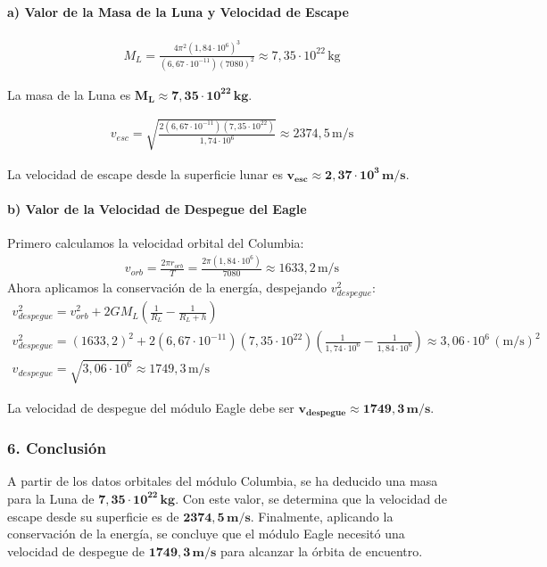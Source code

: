 \paragraph*{a) Valor de la Masa de la Luna y Velocidad de Escape}
\begin{gather}
    M_L = \frac{4\pi^2 (1,84 \cdot 10^6)^3}{(6,67 \cdot 10^{-11})(7080)^2} \approx 7,35 \cdot 10^{22} \, \text{kg}
\end{gather}
\begin{cajaresultado}
    La masa de la Luna es $\boldsymbol{M_L \approx 7,35 \cdot 10^{22} \, kg}$.
\end{cajaresultado}
\medskip
\begin{gather}
    v_{esc} = \sqrt{\frac{2 (6,67 \cdot 10^{-11}) (7,35 \cdot 10^{22})}{1,74 \cdot 10^6}} \approx 2374,5 \, \text{m/s}
\end{gather}
\begin{cajaresultado}
    La velocidad de escape desde la superficie lunar es $\boldsymbol{v_{esc} \approx 2,37 \cdot 10^3 \, m/s}$.
\end{cajaresultado}

\paragraph*{b) Valor de la Velocidad de Despegue del Eagle}
Primero calculamos la velocidad orbital del Columbia:
\begin{gather}
    v_{orb} = \frac{2\pi r_{orb}}{T} = \frac{2\pi (1,84 \cdot 10^6)}{7080} \approx 1633,2 \, \text{m/s}
\end{gather}
Ahora aplicamos la conservación de la energía, despejando $v_{despegue}^2$:
\begin{gather}
    v_{despegue}^2 = v_{orb}^2 + 2 G M_L \left(\frac{1}{R_L} - \frac{1}{R_L+h}\right) \nonumber \\
    v_{despegue}^2 = (1633,2)^2 + 2(6,67\cdot 10^{-11})(7,35\cdot 10^{22}) \left(\frac{1}{1,74\cdot 10^6} - \frac{1}{1,84\cdot 10^6}\right) \approx 3,06 \cdot 10^6 \, (\text{m/s})^2 \nonumber \\
    v_{despegue} = \sqrt{3,06 \cdot 10^6} \approx 1749,3 \, \text{m/s}
\end{gather}
\begin{cajaresultado}
    La velocidad de despegue del módulo Eagle debe ser $\boldsymbol{v_{despegue} \approx 1749,3 \, m/s}$.
\end{cajaresultado}

\subsubsection*{6. Conclusión}
\begin{cajaconclusion}
    A partir de los datos orbitales del módulo Columbia, se ha deducido una masa para la Luna de $\mathbf{7,35 \cdot 10^{22} \, kg}$. Con este valor, se determina que la velocidad de escape desde su superficie es de $\mathbf{2374,5 \, m/s}$. Finalmente, aplicando la conservación de la energía, se concluye que el módulo Eagle necesitó una velocidad de despegue de $\mathbf{1749,3 \, m/s}$ para alcanzar la órbita de encuentro.
\end{cajaconclusion}

